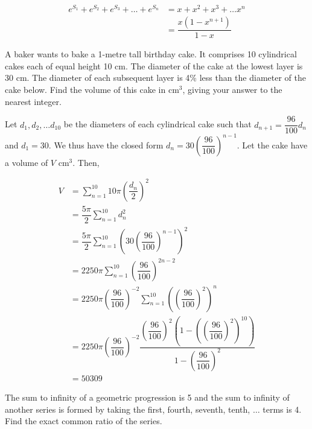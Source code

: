 \documentclass{jhwhw}
\begin{document}
        \begin{equation*}
            \begin{aligned}
                e^{S_1} + e^{S_2} + e^{S_3} + \ldots + e^{S_n} &= x + x^2 + x^3 + \ldots x^n\\
                &= \dfrac{x(1-x^{n+1})}{1-x}
            \end{aligned}
        \end{equation*}


    \problem{}
        A baker wants to bake a 1-metre tall birthday cake. It comprises 10 cylindrical cakes each of equal height 10 cm. The diameter of the cake at the lowest layer is 30 cm. The diameter of each subsequent layer is 4\% less than the diameter of the cake below. Find the volume of this cake in cm$^3$, giving your answer to the nearest integer.

    \solution
        Let $d_1, d_2, \ldots d_{10}$ be the diameters of each cylindrical cake such that $d_{n+1} = \dfrac{96}{100}d_n$ and $d_1 = 30$. We thus have the closed form $d_n = 30\left(\dfrac{96}{100}\right)^{n-1}$. Let the cake have a volume of $V$ cm$^3$. Then,

        \begin{equation*}
            \begin{aligned}
                V &= \sum_{n=1}^{10} 10\pi \left(\dfrac{d_n}2\right)^2 \\
                &= \dfrac{5\pi}2 \sum_{n=1}^{10} d^2_n \\
                &= \dfrac{5\pi}2 \sum_{n=1}^{10} \left(30\left(\dfrac{96}{100}\right)^{n-1}\right)^2\\
                &= 2250\pi \sum_{n=1}^{10} \left(\dfrac{96}{100}\right)^{2n-2}\\
                &= 2250\pi \left(\dfrac{96}{100}\right)^{-2} \sum_{n=1}^{10} \left(\left(\dfrac{96}{100}\right)^2\right)^{n}\\
                &= 2250\pi \left(\dfrac{96}{100}\right)^{-2} \dfrac{\left(\dfrac{96}{100}\right)^2 \left(1 - \left(\left(\dfrac{96}{100}\right)^2\right)^{10}\right)}{1-\left(\dfrac{96}{100}\right)^2}\\
                &= 50309
            \end{aligned}
        \end{equation*}

    \problem{}
        The sum to infinity of a geometric progression is 5 and the sum to infinity of another series is formed by taking the first, fourth, seventh, tenth, $\ldots$ terms is 4. Find the exact common ratio of the series.
\end{document}
